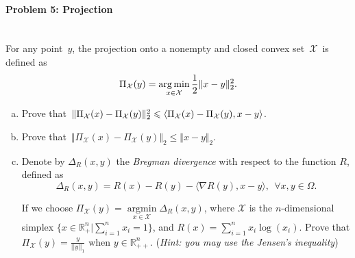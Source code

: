 \documentclass[a4paper]{article}
\begin{document}
\paragraph{Problem 5: Projection}
~\\

\noindent
For any point~$y$, the projection onto a nonempty and closed convex set~$\mathcal{X}$~is defined as
\begin{equation}
    \Pi_{\mathcal{X}} (y) = \mathop{\arg\min}\limits_{x \in \mathcal{X}} \frac{1}{2} \Vert x - y \Vert^2_2. \notag
\end{equation}

\begin{enumerate}[a)]
    \item Prove that~$\Vert \Pi_{\mathcal{X}} (x) - \Pi_{\mathcal{X}} (y) \Vert^2_2 \leqslant \Braket{\Pi_{\mathcal{X}} (x) - \Pi_{\mathcal{X}} (y), x - y}$.

    \item Prove that~$\Vert \Pi_{\mathcal{X}} (x) - \Pi_{\mathcal{X}} (y) \Vert_2 \leqslant \Vert x - y \Vert_2$.

    \item  Denote by $\Delta_{R} (x, y)$ the \textit{Bregman divergence} with respect to the function $R$, defined as
          \begin{equation*}\label{bregman divergence}
              \Delta_{R} (x, y) = R(x) - R(y) - \langle \nabla R(y), x - y \rangle, ~~\forall x, y \in \Omega.
          \end{equation*}

          If we choose $\Pi_{\mathcal{X}} (y) = \mathop{\arg\min}\limits_{x \in \mathcal{X}} \Delta_{R}(x,y) $, where $\mathcal{X}$ is the $n$-dimensional simplex $\{x\in\mathbb{R}^n_{+} \vert \sum_{i=1}^n x_i=1\}$,  and $R(x)=\sum_{i=1}^n x_i\log(x_i)$. Prove that $\Pi_{\mathcal{X}} (y)=\frac{y}{||y||_1}$ when $y\in\mathbb{R}^n_{++}$. (\textit{Hint: you may use the Jensen’s inequality})
\end{enumerate}
\end{document}
